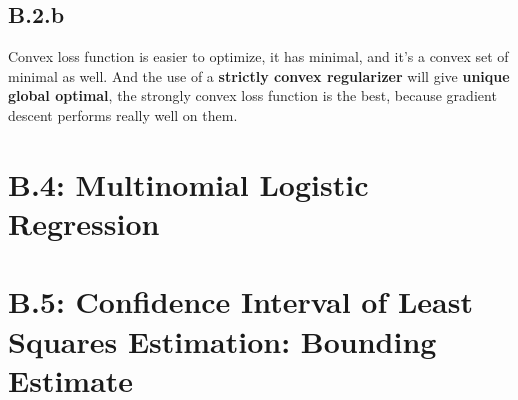 \documentclass[]{article}
\begin{document}
    \subsection*{B.2.b}
        Convex loss function is easier to optimize, it has minimal, and it's a convex set of minimal as well. And the use of a \textbf{strictly convex regularizer} will give \textbf{unique global optimal}, the strongly convex loss function is the best, because gradient descent performs really well on them. 
\section*{B.4: Multinomial Logistic Regression}
        
\section*{B.5: Confidence Interval of Least Squares Estimation: Bounding Estimate}
\end{document}
